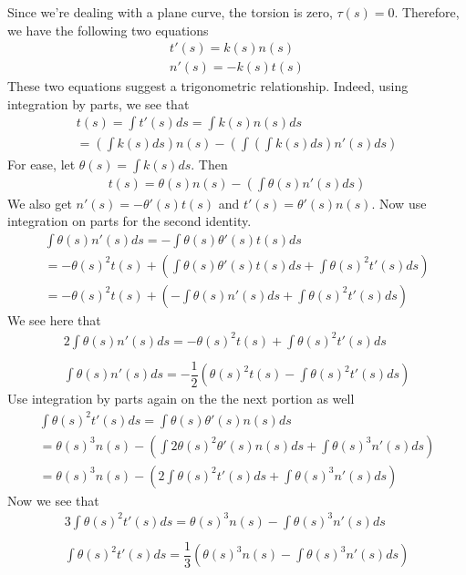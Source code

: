 \documentclass{article}
\begin{document}
	Since we're dealing with a plane curve, the torsion is zero, $\tau(s) = 0$. Therefore, we have the following two equations
	\begin{gather*}
		t'(s) = k(s) n(s) \\
		n'(s) = -k(s) t(s)
	\end{gather*}
	These two equations suggest a trigonometric relationship. Indeed, using integration by parts, we see that
	\begin{gather*}
		t(s) = \int t'(s) ds = \int k(s) n(s) ds \\
		= \left( \int k(s) ds \right) n(s) - \left( \int \left( \int k(s) ds \right) n'(s) ds \right)
	\end{gather*}
	For ease, let $\theta(s) = \int k(s) ds$. Then
	\begin{gather*}
		t(s) = \theta(s) n(s) - \left( \int \theta(s) n'(s) ds \right)
	\end{gather*}
	We also get $n'(s) = -\theta'(s) t(s)$ and $t'(s) = \theta'(s) n(s)$. Now use integration on parts for the second identity.
	\begin{gather*}
		\int \theta(s) n'(s) ds = - \int \theta(s) \theta'(s) t(s) ds \\
		= - \theta(s)^2 t(s) + \left( \int \theta(s) \theta'(s) t(s) ds + \int \theta(s)^2 t'(s) ds \right) \\
		= - \theta(s)^2 t(s) + \left( -\int \theta(s) n'(s) ds + \int \theta(s)^2 t'(s) ds \right)
	\end{gather*}
	We see here that
	\begin{gather*}
		2 \int \theta(s) n'(s) ds = - \theta(s)^2 t(s) + \int \theta(s)^2 t'(s) ds \\ \\
		\int \theta(s) n'(s) ds = - \dfrac{1}{2} \left( \theta(s)^2 t(s) - \int \theta(s)^2 t'(s) ds \right)
	\end{gather*}
	Use integration by parts again on the the next portion as well
	\begin{gather*}
		\int \theta(s)^2 t'(s) ds = \int \theta(s) \theta'(s) n(s) ds \\
		= \theta(s)^3 n(s) - \left( \int 2\theta(s)^2 \theta'(s) n(s) ds + \int \theta(s)^3 n'(s)  ds \right) \\
		= \theta(s)^3 n(s) - \left( 2\int \theta(s)^2 t'(s) ds + \int \theta(s)^3 n'(s) ds \right)
	\end{gather*}
	Now we see that
	\begin{gather*}
		3 \int \theta(s)^2 t'(s) ds = \theta(s)^3 n(s) - \int \theta(s)^3 n'(s) ds \\ \\
		\int \theta(s)^2 t'(s) ds = \dfrac{1}{3} \left( \theta(s)^3 n(s) - \int \theta(s)^3 n'(s) ds \right)
	\end{gather*}
\end{document}
